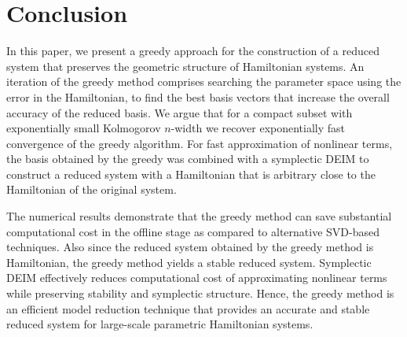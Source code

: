 \section{Conclusion} \label{chap:Con:1}

In this paper, we present a greedy approach for the construction of a reduced system that preserves the geometric structure of Hamiltonian systems. An iteration of the greedy method comprises searching the parameter space using the error in the Hamiltonian, to find the best basis vectors that increase the overall accuracy of the reduced basis. We argue that for a compact subset with exponentially small Kolmogorov $n$-width we recover exponentially fast convergence of the greedy algorithm. For fast approximation of nonlinear terms, the basis obtained by the greedy was combined with a symplectic DEIM to construct {\edit a reduced system with a Hamiltonian that is arbitrary close to the Hamiltonian of the original system.}




The numerical results demonstrate that the greedy method can save substantial computational cost in the offline stage as compared to alternative SVD-based techniques. Also since the reduced system obtained by the greedy method is Hamiltonian, the greedy method yields a stable reduced system. Symplectic DEIM effectively reduces computational cost of approximating nonlinear terms while preserving stability and symplectic structure. Hence, the greedy method is an efficient model reduction technique that provides an accurate and stable reduced system for large-scale parametric Hamiltonian systems.


